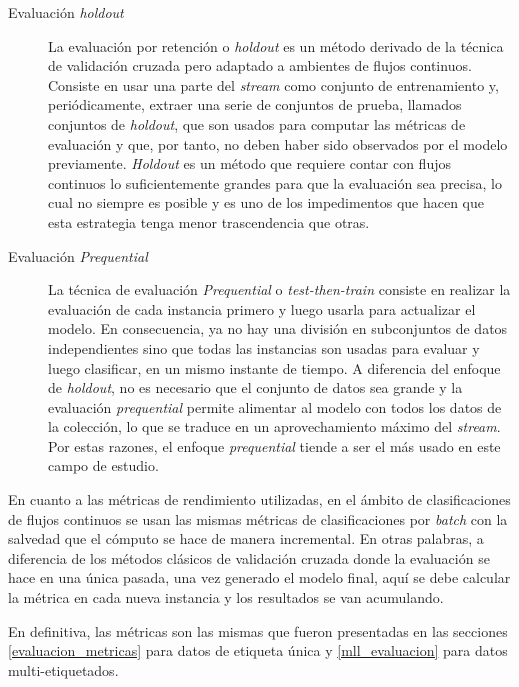 \begin{description} 

   \item[Evaluación \textit{holdout}] La evaluación por retención o
      \textit{holdout} es un método derivado de la técnica de validación cruzada
      pero adaptado a ambientes de flujos continuos. Consiste en usar una parte
      del \textit{stream} como conjunto de entrenamiento y, periódicamente,
      extraer una serie de conjuntos de prueba, llamados conjuntos de
      \textit{holdout}, que son usados para computar las métricas de evaluación
      y que, por tanto, no deben haber sido observados por el modelo
      previamente.  \textit{Holdout} es un método que requiere contar con flujos
      continuos lo suficientemente grandes para que la evaluación sea precisa,
      lo cual no siempre es posible y es uno de los impedimentos que hacen que
      esta estrategia tenga menor trascendencia que otras.

   \item[Evaluación \textit{Prequential}] La técnica de evaluación
      \textit{Prequential} o \textit{test-then-train} consiste en realizar la
      evaluación de cada instancia primero y luego usarla para actualizar el
      modelo. En consecuencia, ya no hay una división en subconjuntos de datos
      independientes sino que todas las instancias son usadas para evaluar y
      luego clasificar, en un mismo instante de tiempo. A diferencia del enfoque
      de \textit{holdout}, no es necesario que el conjunto de datos sea grande y
      la evaluación \textit{prequential} permite alimentar al modelo con todos
      los datos de la colección, lo que se traduce en un aprovechamiento máximo
      del \textit{stream}. Por estas razones, el enfoque \textit{prequential}
      tiende a ser el más usado en este campo de estudio.

\end{description} 

En cuanto a las métricas de rendimiento utilizadas, en el ámbito de
clasificaciones de flujos continuos se usan las mismas métricas de
clasificaciones por \textit{batch} con la salvedad que el cómputo se hace de
manera incremental. En otras palabras, a diferencia de los métodos clásicos de
validación cruzada donde la evaluación se hace en una única pasada, una vez
generado el modelo final, aquí se debe calcular la métrica en cada nueva
instancia y los resultados se van acumulando.

En definitiva, las métricas son las mismas que fueron presentadas en las
secciones \ref{evaluacion_metricas} para datos de etiqueta única y
\ref{mll_evaluacion} para datos multi-etiquetados.


